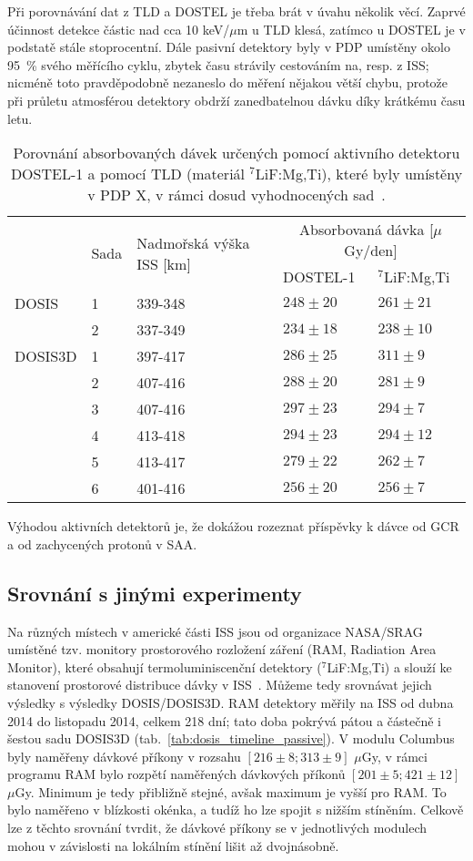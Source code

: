Při porovnávání dat z TLD a DOSTEL je třeba brát v úvahu několik věcí. Zaprvé účinnost detekce částic nad cca 10 keV/$\mu$m u TLD klesá, zatímco u DOSTEL je v podstatě stále stoprocentní. Dále pasivní detektory byly v PDP umístěny okolo 95~\% svého měřícího cyklu, zbytek času strávily cestováním na, resp. z ISS; nicméně toto pravděpodobně nezaneslo do měření nějakou větší chybu, protože při průletu atmosférou detektory obdrží zanedbatelnou dávku díky krátkému času letu.
\begin{table}[H]
  \centering
  \def\arraystretch{1}
  \footnotesize
  \caption{Porovnání absorbovaných dávek určených pomocí aktivního detektoru DOSTEL-1 a pomocí TLD (materiál $^7$LiF:Mg,Ti), které byly umístěny v PDP X, v rámci dosud vyhodnocených sad~\cite{dosis}.}
  \label{tab:dosis_vysl_srovnaniPassiveActive}
  \begin{tabular}{lll|ll}
	\toprule
	&\multirow{2}{*}{Sada}&\multirow{2}{*}{Nadmořská výška ISS [km]}&\multicolumn{2}{c}{Absorbovaná dávka [$\mu$Gy/den]}\\
	 & & &DOSTEL-1&$^7$LiF:Mg,Ti\\
	\midrule
	DOSIS	&1&339-348&$248\pm20$&$261\pm21$\\ 
    		&2&337-349&$234\pm18$&$238\pm10$\\
    DOSIS3D	&1&397-417&$286\pm25$&$311\pm9 $\\
    		&2&407-416&$288\pm20$&$281\pm9 $\\
    		&3&407-416&$297\pm23$&$294\pm7 $\\
    		&4&413-418&$294\pm23$&$294\pm12$\\
    		&5&413-417&$279\pm22$&$262\pm7 $\\
    		&6&401-416&$256\pm20$&$256\pm7 $\\
	\bottomrule
  \end{tabular}
\end{table}

Výhodou aktivních detektorů je, že dokážou rozeznat příspěvky k dávce od GCR a od zachycených protonů v SAA.
\subsection{Srovnání s jinými experimenty}
Na různých místech v americké části ISS jsou od organizace NASA/SRAG umístěné tzv. monitory prostorového rozložení záření (RAM, Radiation Area Monitor), které obsahují termoluminiscenční detektory ($^7$LiF:Mg,Ti) a slouží ke stanovení prostorové distribuce dávky v ISS~\cite{RAM}. Můžeme tedy srovnávat jejich výsledky s výsledky DOSIS/DOSIS3D. RAM detektory měřily na ISS od dubna 2014 do listopadu 2014, celkem 218 dní; tato doba pokrývá pátou a částečně i šestou sadu DOSIS3D (tab.~\ref{tab:dosis_timeline_passive}). V modulu Columbus byly naměřeny dávkové příkony v rozsahu $[216\pm8;313\pm9]$ $\mu$Gy, v rámci programu RAM bylo rozpětí naměřených dávkových příkonů $[201\pm5;421\pm12]$ $\mu$Gy. Minimum je tedy přibližně stejné, avšak maximum je vyšší pro RAM. To bylo naměřeno v blízkosti okénka, a
tudíž ho lze spojit s nižším stíněním. Celkově lze z těchto srovnání tvrdit, že dávkové příkony se v jednotlivých modulech mohou v závislosti na lokálním stínění lišit až dvojnásobně.~\cite{dosis}

